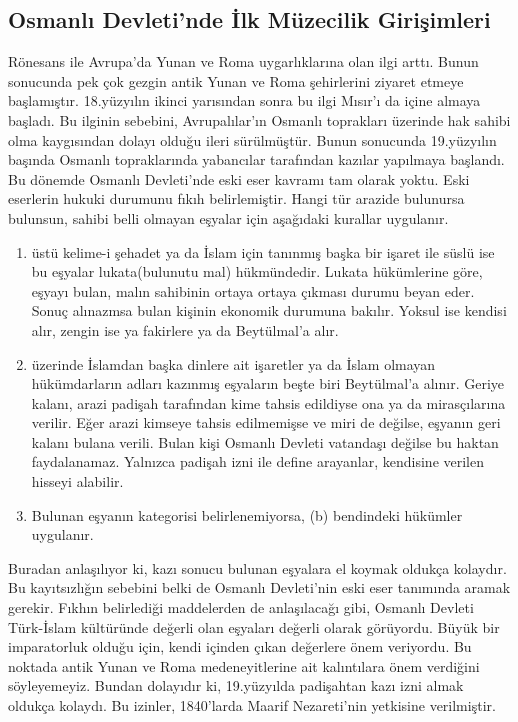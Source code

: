 \subsection{Osmanlı Devleti'nde İlk Müzecilik Girişimleri}
\indent\indent Rönesans ile Avrupa'da Yunan ve Roma uygarlıklarına olan ilgi arttı. Bunun sonucunda pek çok gezgin antik Yunan ve Roma şehirlerini ziyaret etmeye başlamıştır. 18.yüzyılın ikinci yarısından sonra bu ilgi Mısır'ı da içine almaya başladı. Bu ilginin sebebini, Avrupalılar'ın Osmanlı toprakları üzerinde hak sahibi olma kaygısından dolayı olduğu ileri sürülmüştür.\cite{shaw} Bunun sonucunda 19.yüzyılın başında Osmanlı topraklarında yabancılar tarafından kazılar yapılmaya başlandı. Bu dönemde Osmanlı Devleti'nde eski eser kavramı tam olarak yoktu. Eski eserlerin hukuki durumunu fıkıh belirlemiştir. Hangi tür arazide bulunursa bulunsun, sahibi belli olmayan eşyalar için aşağıdaki kurallar uygulanır.\cite{mumcu_1}
\begin{enumerate}[label=\alph*)]
    \item üstü kelime-i şehadet ya da İslam için tanınmış başka bir işaret ile süslü ise bu eşyalar lukata(bulunutu mal) hükmündedir. Lukata hükümlerine göre, eşyayı bulan, malın sahibinin ortaya ortaya çıkması durumu beyan eder. Sonuç alınazmsa bulan kişinin ekonomik durumuna bakılır. Yoksul ise kendisi alır, zengin ise ya fakirlere ya da Beytülmal'a alır.
    \item üzerinde İslamdan başka dinlere ait işaretler ya da İslam olmayan hükümdarların adları kazınmış eşyaların beşte biri Beytülmal'a alınır. Geriye kalanı, arazi padişah tarafından kime tahsis edildiyse ona ya da mirasçılarına verilir. Eğer arazi kimseye tahsis edilmemişse ve miri de değilse, eşyanın geri kalanı bulana verili. Bulan kişi Osmanlı Devleti vatandaşı değilse bu haktan faydalanamaz. Yalnızca padişah izni ile define arayanlar, kendisine verilen hisseyi alabilir.
    \item Bulunan eşyanın kategorisi belirlenemiyorsa, (b) bendindeki hükümler uygulanır.
\end{enumerate}
\indent\indent Buradan anlaşılıyor ki, kazı sonucu bulunan eşyalara el koymak oldukça kolaydır. Bu kayıtsızlığın sebebini belki de Osmanlı Devleti'nin eski eser tanımında aramak gerekir. Fıkhın belirlediği maddelerden de anlaşılacağı gibi, Osmanlı Devleti Türk-İslam kültüründe değerli olan eşyaları değerli olarak görüyordu. Büyük bir imparatorluk olduğu için, kendi içinden çıkan değerlere önem veriyordu. Bu noktada antik Yunan ve Roma medeneyitlerine ait kalıntılara önem verdiğini söyleyemeyiz. Bundan dolayıdır ki, 19.yüzyılda padişahtan kazı izni almak oldukça kolaydı. Bu izinler, 1840'larda Maarif Nezareti'nin yetkisine verilmiştir.\cite{dilbaz_1}\newline
